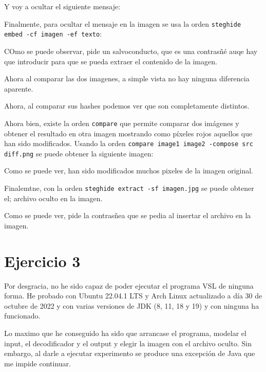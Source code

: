 \documentclass{article}
\begin{document}

Y voy a ocultar el siguiente mensaje:


Finalmente, para ocultar el mensaje en la imagen se usa la orden \verb|steghide embed -cf imagen -ef texto|:


COmo se puede observar, pide un salvoconducto, que es una contrasñé auqe hay que introducir para que se pueda extraer el contenido de la imagen.

Ahora al comparar las dos imagenes, a simple vista no hay ninguna diferencia aparente.


Ahora, al comparar sus hashes podemos ver que son completamente distintos.


Ahora bien, existe la orden \verb|compare| que permite comparar dos imágenes y obtener el resultado en otra imagen mostrando como píxeles rojos aquellos que han sido modificados. Usando la orden \verb|compare image1 image2 -compose src diff.png| se puede obtener la siguiente imagen:


Como se puede ver, han sido modificados muchos pixeles de la imagen original.

Finalemtne, con la orden \verb|steghide extract -sf imagen.jpg| se puede obtener el; archivo oculto en la imagen.


Como se puede ver, pide la contrasñea que se pedia al insertar el archivo en la imagen.


\section*{Ejercicio 3}

Por desgracia, no he sido capaz de poder ejecutar el programa VSL de ninguna forma. He probado con Ubuntu 22.04.1 LTS y Arch Linux actualizado a día 30 de octubre de 2022 y con varias versiones de JDK (8, 11, 18 y 19) y con ninguna ha funcionado. 

Lo maximo que he conseguido ha sido que arrancase el programa, modelar el input, el decodificador y el output y elegir la imagen con el archivo oculto. Sin embargo, al darle a ejecutar experimento se produce una excepción de Java que me impide continuar.
\end{document}
